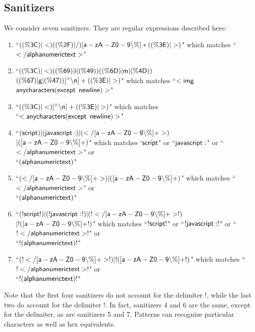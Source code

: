 \subsection{Sanitizers} \label{ss:sanitizers}
We consider seven sanitizers. They are regular expressions described here:
\begin{enumerate}
	\item ``$\sf{((\%3C)|<)((\%2F)|/)[a-zA-Z0-9\backslash\%]*((\%3E)|>)}$" which matches ``$\sf{</alphanumerictext>}$"
	\item ``$\sf{((\%3C)|<)((\%69)|i|(\%49))((\%6D)|m|(\%4D))}$\\$\sf{((\%67)|g|(\%47))[^\wedge\backslash n]+((\%3E)|>)}$" which matches ``$\sf{<img}$ $\sf{anycharacters(except}$ $\sf{newline)>}$"
	\item ``$\sf{((\%3C)|<)[^\wedge\backslash n]+((\%3E)|>)}$" which matches \\``$\sf{<anycharacters(except}$ $\sf{newline)>}$"
	\item ``$\sf{(script)|(javascript:)|(</[a-zA-Z0-9\backslash\%]+>)}$\\$\sf{|([a-zA-Z0-9\backslash\%]+)}$" which matches `$\sf{script}$" or ``$\sf{javascript:}$" or ``$\sf{</alphanumerictext>}$" or \\``$\sf{(alphanumerictext)}$"
	\item ``$\sf{(</[a-zA-Z0-9\backslash\%]+>)|([a-zA-Z0-9\backslash\%]+)}$" which matches ``$\sf{</alphanumerictext>}$" or\\ ``$\sf{(alphanumerictext)}$"
	\item ``$\sf{(!script!)|(!javascript:!)|(!</[a-zA-Z0-9\backslash\%]+>!)}$\\$\sf{|!([a-zA-Z0-9\backslash\%]+!)}$" which matches ``$\sf{!script!}$" or ``$\sf{!javascript:!}$" or ``$\sf{!</alphanumerictext>!}$" or \\ ``$\sf{!(alphanumerictext)!}$"
	\item ``$\sf{(!</[a-zA-Z0-9\backslash\%]+>!)|!([a-zA-Z0-9\backslash\%]+!)}$" which matches ``$\sf{!</alphanumerictext>!}$" or\\ ``$\sf{!(alphanumerictext)!}$"
\end{enumerate}
Note that the first four sanitizers do not account for the delimiter $!$, while the last two do account for the delimiter $!$. In fact, sanitizers 4 and 6 are the same, except for the delimiter, as are sanitizers 5 and 7. Patterns can recognize particular characters as well as hex equivalents. 

